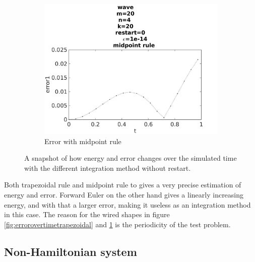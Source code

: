 \begin{figure}[H]
\begin{subfigure}[b]{0.30\textwidth}
                \includegraphics[width=\textwidth]{../MATLAB/fig/errorovertimemidpoint.jpg}
                \caption{ Error with midpoint rule }
                \label{fig:errorovertimemidpoint}
        \end{subfigure}
        \caption{A snapshot of how energy and error changes over the simulated time with the different integration method without restart.}
        \label{fig:error}
\end{figure}
Both trapezoidal rule and midpoint rule to gives a very precise estimation of energy and error. Forward Euler on the other hand gives a linearly increasing energy, and with that a larger error, making it useless as an integration method in this case. The reason for the wired shapes in figure \ref{fig:errorovertimetrapezoidal} and \ref{fig:errorovertimemidpoint} is the periodicity of the test problem. 
\subsection{Non-Hamiltonian system}%

